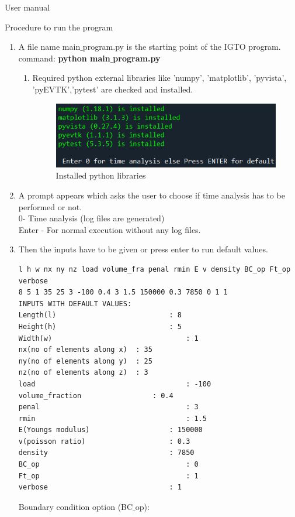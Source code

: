 \documentclass[a4paper,12pt,times]{article}
\begin{document}
\begin{section}{User manual}
\begin{subsection}{Procedure to run the program}
\begin{enumerate}
    \item A file name main$\_$program.py is the starting point of the IGTO program.\\
    command: \textbf{python main$\_$program.py} 
    \begin{enumerate}
        \item Required python external libraries like 'numpy', 'matplotlib', 'pyvista', 'pyEVTK','pytest' are checked and installed.
       \begin{figure}[H]
	\begin{center}
		\includegraphics[scale=1]{installed_lib.png} 
		\caption{Installed python libraries}\label{installed python}
	\end{center}	
\end{figure}
    \end{enumerate}
    \item A prompt appears which asks the user to choose if time analysis has to be performed or not.\\ 
    0- Time analysis (log files are generated)\\
    Enter - For normal execution without any log files.
    
    \item Then the inputs have to be given or press enter to run default values.
    \begin{lstlisting}
l h w nx ny nz load volume_fra penal rmin E v density BC_op Ft_op verbose
8 5 1 35 25 3 -100 0.4 3 1.5 150000 0.3 7850 0 1 1
INPUTS WITH DEFAULT VALUES:
Length(l)							: 8     
Height(h)							: 5
Width(w)								: 1
nx(no of elements along x)	: 35
ny(no of elements along y)  : 25
nz(no of elements along z)	: 3
load									: -100
volume_fraction					: 0.4
penal									: 3
rmin									: 1.5
E(Youngs modulus)					: 150000
v(poisson ratio)					: 0.3
density								: 7850
BC_op									: 0
Ft_op									: 1
verbose								: 1

    \end{lstlisting}
    
Boundary condition option (BC$\_$op):\\
    \begin{lstlisting}


\end{lstlisting}
\end{enumerate}
\end{subsection}
\end{section}
\end{document}

